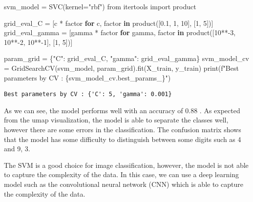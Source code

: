 \documentclass[
  letterpaper,
  DIV=11,
  numbers=noendperiod]{scrartcl}
\newenvironment{Shaded}{\begin{snugshade}}{\end{snugshade}}
\newcommand{\BuiltInTok}[1]{\textcolor[rgb]{0.00,0.23,0.31}{#1}}
\newcommand{\ControlFlowTok}[1]{\textcolor[rgb]{0.00,0.23,0.31}{\textbf{#1}}}
\newcommand{\DecValTok}[1]{\textcolor[rgb]{0.68,0.00,0.00}{#1}}
\newcommand{\FloatTok}[1]{\textcolor[rgb]{0.68,0.00,0.00}{#1}}
\newcommand{\ImportTok}[1]{\textcolor[rgb]{0.00,0.46,0.62}{#1}}
\newcommand{\KeywordTok}[1]{\textcolor[rgb]{0.00,0.23,0.31}{\textbf{#1}}}
\newcommand{\NormalTok}[1]{\textcolor[rgb]{0.00,0.23,0.31}{#1}}
\newcommand{\OperatorTok}[1]{\textcolor[rgb]{0.37,0.37,0.37}{#1}}
\newcommand{\SpecialCharTok}[1]{\textcolor[rgb]{0.37,0.37,0.37}{#1}}
\newcommand{\SpecialStringTok}[1]{\textcolor[rgb]{0.13,0.47,0.30}{#1}}
\newcommand{\StringTok}[1]{\textcolor[rgb]{0.13,0.47,0.30}{#1}}
\begin{document}
\begin{Shaded}
\begin{Highlighting}[]
\NormalTok{svm\_model }\OperatorTok{=}\NormalTok{ SVC(kernel}\OperatorTok{=}\StringTok{"rbf"}\NormalTok{)}
\ImportTok{from}\NormalTok{ itertools }\ImportTok{import}\NormalTok{ product}

\NormalTok{grid\_eval\_C }\OperatorTok{=}\NormalTok{ [c }\OperatorTok{*}\NormalTok{ factor }\ControlFlowTok{for}\NormalTok{ c, factor }\KeywordTok{in}\NormalTok{ product([}\FloatTok{0.1}\NormalTok{, }\DecValTok{1}\NormalTok{, }\DecValTok{10}\NormalTok{], [}\DecValTok{1}\NormalTok{, }\DecValTok{5}\NormalTok{])]}
\NormalTok{grid\_eval\_gamma }\OperatorTok{=}\NormalTok{ [gamma }\OperatorTok{*}\NormalTok{ factor }\ControlFlowTok{for}\NormalTok{ gamma, factor }\KeywordTok{in}\NormalTok{ product([}\DecValTok{10}\OperatorTok{**{-}}\DecValTok{3}\NormalTok{, }\DecValTok{10}\OperatorTok{**{-}}\DecValTok{2}\NormalTok{, }\DecValTok{10}\OperatorTok{**{-}}\DecValTok{1}\NormalTok{], [}\DecValTok{1}\NormalTok{, }\DecValTok{5}\NormalTok{])]}


\NormalTok{param\_grid }\OperatorTok{=}\NormalTok{ \{}\StringTok{"C"}\NormalTok{: grid\_eval\_C, }\StringTok{"gamma"}\NormalTok{: grid\_eval\_gamma\}}
\NormalTok{svm\_model\_cv }\OperatorTok{=}\NormalTok{ GridSearchCV(svm\_model, param\_grid).fit(X\_train, y\_train)}
\BuiltInTok{print}\NormalTok{(}\SpecialStringTok{f"Best parameters by CV : }\SpecialCharTok{\{}\NormalTok{svm\_model\_cv}\SpecialCharTok{.}\NormalTok{best\_params\_}\SpecialCharTok{\}}\SpecialStringTok{"}\NormalTok{)}
\end{Highlighting}
\end{Shaded}

\begin{verbatim}
Best parameters by CV : {'C': 5, 'gamma': 0.001}
\end{verbatim}

As we can see, the model performs well with an accuracy of 0.88 . As
expected from the umap visualization, the model is able to separate the
classes well, however there are some errors in the classification. The
confusion matrix shows that the model has some difficulty to distinguish
between some digits such as 4 and 9, 3.

The SVM is a good choice for image classification, however, the model is
not able to capture the complexity of the data. In this case, we can use
a deep learning model such as the convolutional neural network (CNN)
which is able to capture the complexity of the data.
\end{document}
